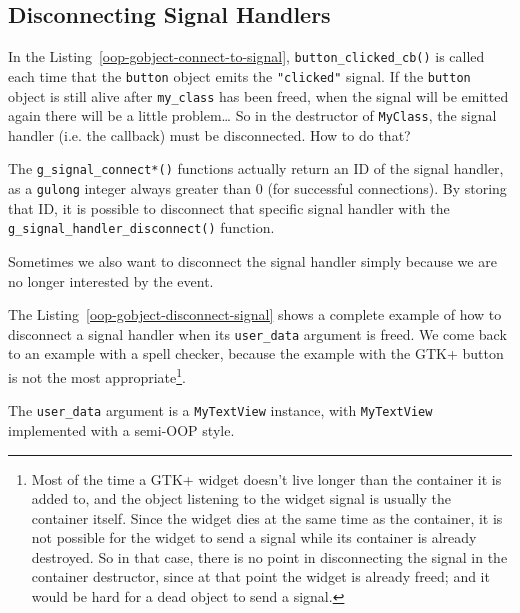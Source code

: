 \subsection{Disconnecting Signal Handlers}

In the Listing~\ref{oop-gobject-connect-to-signal}, \lstinline{button_clicked_cb()} is called each time that the \lstinline{button} object emits the \lstinline{"clicked"} signal. If the \lstinline{button} object is still alive after \lstinline{my_class} has been freed, when the signal will be emitted again there will be a little problem… So in the destructor of \lstinline{MyClass}, the signal handler (i.e. the callback) must be disconnected. How to do that?

The \lstinline{g_signal_connect*()} functions actually return an ID of the signal handler, as a \lstinline{gulong} integer always greater than 0 (for successful connections). By storing that ID, it is possible to disconnect that specific signal handler with the \lstinline{g_signal_handler_disconnect()} function.

Sometimes we also want to disconnect the signal handler simply because we are no longer interested by the event.

The Listing~\ref{oop-gobject-disconnect-signal} shows a complete example of how to disconnect a signal handler when its \lstinline{user_data} argument is freed. We come back to an example with a spell checker, because the example with the GTK+ button is not the most appropriate\footnote{Most of the time a GTK+ widget doesn't live longer than the container it is added to, and the object listening to the widget signal is usually the container itself. Since the widget dies at the same time as the container, it is not possible for the widget to send a signal while its container is already destroyed. So in that case, there is no point in disconnecting the signal in the container destructor, since at that point the widget is already freed; and it would be hard for a dead object to send a signal.}.

The \lstinline{user_data} argument is a \lstinline{MyTextView} instance, with \lstinline{MyTextView} implemented with a semi-OOP style.





